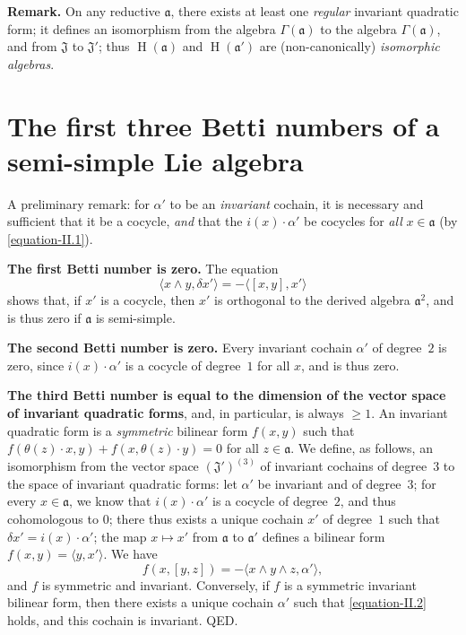 \documentclass{article}
\newcommand{\fk}{\mathfrak}
\renewcommand{\geq}{\geqslant}
\DeclareMathOperator{\HH}{H}
\newcommand{\oldpage}[1]{\marginpar{\footnotesize$\Big\vert$ \textit{p.~#1}}}
\begin{document}
\medskip
\textbf{Remark.}
On any reductive $\fk{a}$, there exists at least one \emph{regular} invariant quadratic form;
it defines an isomorphism from the algebra $\Gamma(\fk{a})$ to the algebra $\Gamma(\fk{a})$, and from $\fk{J}$ to $\fk{J}'$;
thus $\HH(\fk{a})$ and $\HH(\fk{a}')$ are (non-canonically) \emph{isomorphic algebras}.


\section{The first three Betti numbers of a semi-simple Lie algebra}
\label{II.5}

A preliminary remark:
for $\alpha'$ to be an \emph{invariant} cochain, it is necessary and sufficient that it be a cocycle, \emph{and} that the $i(x)\cdot\alpha'$ be cocycles for \emph{all} $x\in\fk{a}$ (by \cref{equation-II.1}).

\medskip
\textbf{The first Betti number is zero.}
The equation
\[
  \langle x\wedge y,\delta x'\rangle
  = -\langle[x,y],x'\rangle
\]
shows that, if $x'$ is a cocycle, then $x'$ is orthogonal to the derived algebra $\fk{a}^2$, and is thus zero if $\fk{a}$ is semi-simple.

\medskip
\textbf{The second Betti number is zero.}
Every invariant cochain $\alpha'$ of degree~$2$ is zero, since $i(x)\cdot\alpha'$ is a cocycle of degree~$1$ for all $x$, and is thus zero.

\medskip
\textbf{The third Betti number is equal to the dimension of the vector space of invariant quadratic forms}, and, in particular, is always $\geq1$.
An invariant quadratic form is a \emph{symmetric} bilinear form $f(x,y)$ such that $f(\theta(z)\cdot x,y)+f(x,\theta(z)\cdot y)=0$ for all $z\in\fk{a}$.
We define, as follows, an isomorphism from the vector space $(\fk{J}')^{(3)}$ of invariant cochains of degree~$3$ to the space of invariant quadratic forms:
let $\alpha'$ be invariant and of degree~$3$;
for every $x\in\fk{a}$, we know that $i(x)\cdot\alpha'$ is a cocycle of degree~$2$, and thus cohomologous to $0$;
there thus exists a unique cochain $x'$ of degree~$1$ such that $\delta x'=i(x)\cdot\alpha'$;
the map $x\mapsto x'$ from $\fk{a}$ to $\fk{a}'$ defines a
\oldpage{49}
bilinear form $f(x,y)=\langle y,x'\rangle$.
We have
\[
\label{equation-II.2}
  f(x,[y,z])
  = -\langle x\wedge y\wedge z,\alpha'\rangle,
\tag{2}
\]
and $f$ is symmetric and invariant.
Conversely, if $f$ is a symmetric invariant bilinear form, then there exists a unique cochain $\alpha'$ such that \cref{equation-II.2} holds, and this cochain is invariant.
QED.
\end{document}
